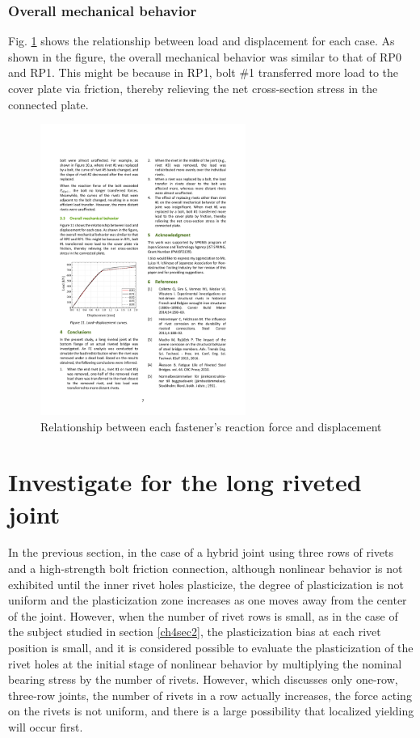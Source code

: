 \subsubsection{Overall mechanical behavior}

Fig. \ref{fig-l11} shows the relationship between load and displacement for each case. As shown in the figure, the overall mechanical behavior was similar to that of RP0 and RP1. This might be because in RP1, bolt \#1 transferred more load to the cover plate via friction, thereby relieving the net cross-section stress in the connected plate.

\begin{figure}[htbp]
    \centering
    \includegraphics[width=0.6\textwidth]{imgs/ch4/fig-l11.pdf}
    \caption{Relationship between each fastener’s reaction force and displacement}
    \label{fig-l11}
\end{figure}

\section{Investigate for the long riveted joint}

In the previous section, in the case of a hybrid joint using three rows of rivets and a high-strength bolt friction connection, although nonlinear behavior is not exhibited until the inner rivet holes plasticize, the degree of plasticization is not uniform and the plasticization zone increases as one moves away from the center of the joint. However, when the number of rivet rows is small, as in the case of the subject studied in section \ref{ch4sec2}, the plasticization bias at each rivet position is small, and it is considered possible to evaluate the plasticization of the rivet holes at the initial stage of nonlinear behavior by multiplying the nominal bearing stress by the number of rivets. However, which discusses only one-row, three-row joints, the number of rivets in a row actually increases, the force acting on the rivets is not uniform, and there is a large possibility that localized yielding will occur first.

